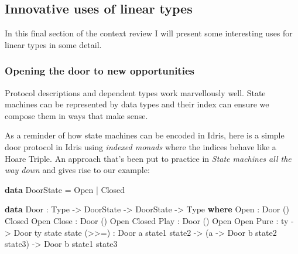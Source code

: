 \documentclass[
]{article}
\newenvironment{Shaded}{}{}
\newcommand{\DataTypeTok}[1]{\textcolor[rgb]{0.56,0.13,0.00}{#1}}
\newcommand{\KeywordTok}[1]{\textcolor[rgb]{0.00,0.44,0.13}{\textbf{#1}}}
\newcommand{\NormalTok}[1]{#1}
\newcommand{\OperatorTok}[1]{\textcolor[rgb]{0.40,0.40,0.40}{#1}}
\newcommand{\OtherTok}[1]{\textcolor[rgb]{0.00,0.44,0.13}{#1}}
\begin{document}
\hypertarget{innovative-uses-of-linear-types}{%
\subsection{Innovative uses of linear
types}\label{innovative-uses-of-linear-types}}

In this final section of the context review I will present some
interesting uses for linear types in some detail.

\hypertarget{opening-the-door-to-new-opportunities}{%
\subsubsection{Opening the door to new
opportunities}\label{opening-the-door-to-new-opportunities}}

Protocol descriptions and dependent types work marvellously well. State
machines can be represented by data types and their index can ensure we
compose them in ways that make sense.

As a reminder of how state machines can be encoded in Idris, here is a
simple door protocol in Idris using \emph{indexed monads}
\cite{parameterised_computation} where the indices behave like a Hoare
Triple. An approach that's been put to practice in \emph{State machines
all the way down}\cite{state_machines} and gives rise to our example:

\begin{Shaded}
\begin{Highlighting}[]
\KeywordTok{data} \DataTypeTok{DoorState} \OtherTok{=} \DataTypeTok{Open} \OperatorTok{|} \DataTypeTok{Closed}

\KeywordTok{data} \DataTypeTok{Door} \OperatorTok{:} \DataTypeTok{Type} \OtherTok{{-}\textgreater{}} \DataTypeTok{DoorState} \OtherTok{{-}\textgreater{}} \DataTypeTok{DoorState} \OtherTok{{-}\textgreater{}} \DataTypeTok{Type} \KeywordTok{where} 
    \DataTypeTok{Open} \OperatorTok{:} \DataTypeTok{Door}\NormalTok{ () }\DataTypeTok{Closed} \DataTypeTok{Open}
    \DataTypeTok{Close} \OperatorTok{:} \DataTypeTok{Door}\NormalTok{ () }\DataTypeTok{Open} \DataTypeTok{Closed}
    \DataTypeTok{Play} \OperatorTok{:} \DataTypeTok{Door}\NormalTok{ () }\DataTypeTok{Open} \DataTypeTok{Open}
    \DataTypeTok{Pure} \OperatorTok{:}\NormalTok{ ty }\OtherTok{{-}\textgreater{}} \DataTypeTok{Door}\NormalTok{ ty state state}
\NormalTok{    (}\OperatorTok{\textgreater{}\textgreater{}=}\NormalTok{) }\OperatorTok{:} \DataTypeTok{Door}\NormalTok{ a state1 state2 }\OtherTok{{-}\textgreater{}}
\NormalTok{             (a }\OtherTok{{-}\textgreater{}} \DataTypeTok{Door}\NormalTok{ b state2 state3) }\OtherTok{{-}\textgreater{}}
             \DataTypeTok{Door}\NormalTok{ b state1 state3}
\end{Highlighting}
\end{Shaded}
\end{document}
